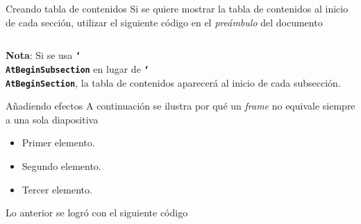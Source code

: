 \documentclass{beamer}
\newcommand{\bftt}[1]{\textbf{\texttt{#1}}}
\newcommand{\cmd}[1]{{\color{mygreen}\bftt{#1}}}
\newcommand{\bs}{\char`\\}
\newcommand{\cmdbs}[1]{\cmd{\bs#1}}
\begin{document}
    \begin{frame}{Creando tabla de contenidos}
        \justifying
        Si se quiere mostrar la tabla de contenidos al inicio de cada sección, utilizar el siguiente código en el \textsl{preámbulo} del documento
        \begin{center}
            \begin{minipage}{0.52\linewidth}
                \inputminted[fontsize=\scriptsize, frame=single]{latex}{contents_frame2.tex}
            \end{minipage}
        \end{center}
        \textbf{Nota}: Si se usa \cmdbs{AtBeginSubsection} en lugar de \cmdbs{AtBeginSection}, la tabla de contenidos aparecerá al inicio de cada subsección.
    \end{frame}

    \begin{frame}{Añadiendo efectos}
        A continuación se ilustra por qué un \textsl{frame} no equivale siempre a una sola diapositiva \pause \\ [3ex]
        \begin{minipage}{0.45\linewidth}
            \begin{itemize}
                \item Primer elemento.\pause
                \item Segundo elemento.\pause
                \item Tercer elemento.\pause
            \end{itemize}
        \end{minipage}
        \begin{minipage}{0.45\linewidth}
            Lo anterior se logró con el siguiente código \pause
            \inputminted[fontsize=\scriptsize, frame=single]{latex}{pause_ex.tex}
        \end{minipage}
    \end{frame}
\end{document}
